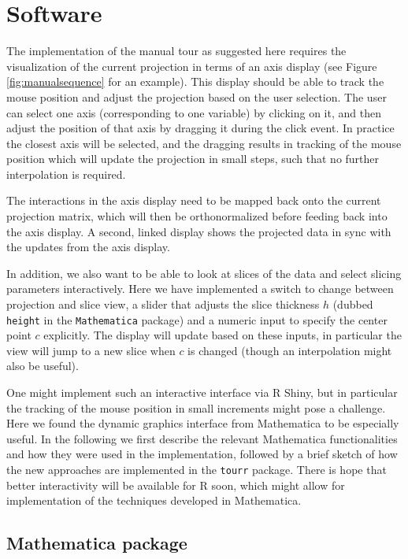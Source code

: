\documentclass[]{interact}
\theoremstyle{plain}%
\theoremstyle{definition}
\theoremstyle{remark}
\begin{document}
\hypertarget{sec:implementation}{%
\section{Software}\label{sec:implementation}}

The implementation of the manual tour as suggested here requires the
visualization of the current projection in terms of an axis display (see
Figure \ref{fig:manualsequence} for an example). This display should be
able to track the mouse position and adjust the projection based on the
user selection. The user can select one axis (corresponding to one
variable) by clicking on it, and then adjust the position of that axis
by dragging it during the click event. In practice the closest axis will
be selected, and the dragging results in tracking of the mouse position
which will update the projection in small steps, such that no further
interpolation is required.

The interactions in the axis display need to be mapped back onto the
current projection matrix, which will then be orthonormalized before
feeding back into the axis display. A second, linked display shows the
projected data in sync with the updates from the axis display.

In addition, we also want to be able to look at slices of the data and
select slicing parameters interactively. Here we have implemented a
switch to change between projection and slice view, a slider that
adjusts the slice thickness \(h\) (dubbed \texttt{height} in the
\texttt{Mathematica} package) and a numeric input to specify the center
point \(c\) explicitly. The display will update based on these inputs,
in particular the view will jump to a new slice when \(c\) is changed
(though an interpolation might also be useful).

One might implement such an interactive interface via R Shiny, but in
particular the tracking of the mouse position in small increments might
pose a challenge. Here we found the dynamic graphics interface from
Mathematica to be especially useful. In the following we first describe
the relevant Mathematica functionalities and how they were used in the
implementation, followed by a brief sketch of how the new approaches are
implemented in the \texttt{tourr} package. There is hope that better
interactivity will be available for R soon, which might allow for
implementation of the techniques developed in Mathematica.

\hypertarget{mathematica-package}{%
\subsection{Mathematica package}\label{mathematica-package}}
\end{document}
